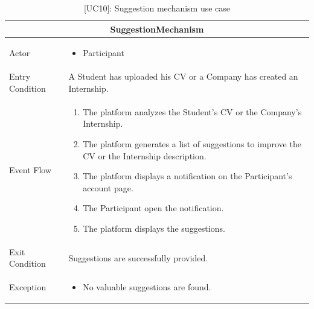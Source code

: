 \begin{table}[H]
    \centering
    \begin{tabular}{|p{3cm}|p{12cm}|}
    \hline
    \multicolumn{2}{|c|}{\textbf{SuggestionMechanism}} \\ \hline
    Actor & 
    \begin{itemize}
        \item Participant
    \end{itemize}\\ \hline
    Entry Condition & A Student has uploaded his CV or a Company has created an Internship.\\ \hline
    Event Flow & 
    \begin{enumerate}         
        \item The platform analyzes the Student's CV or the Company's Internship.
        \item The platform generates a list of suggestions to improve the CV or the Internship description.
        \item The platform displays a notification on the Participant's account page.
        \item The Participant open the notification.
        \item The platform displays the suggestions.
    \end{enumerate} \\ \hline
    Exit Condition & Suggestions are successfully provided. \\ \hline
    Exception & 
    \begin{itemize}        
        \item No valuable suggestions are found.  
    \end{itemize} \\ \hline
    \end{tabular}
    \caption{[UC10]: Suggestion mechanism use case}
    \label{tab:UC10}
\end{table}

